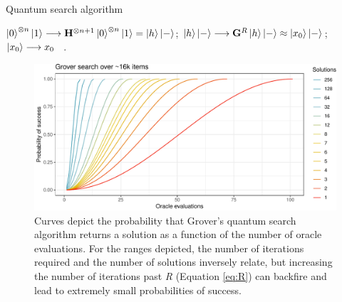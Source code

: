 \documentclass[12pt]{article} %
\DeclarePairedDelimiter{\ceil}{\lceil}{\rceil}
\begin{document}
\begin{algorithm}[t!]
	\caption{Quantum search algorithm \citep{grover1996fast}}\label{alg:grover}
	$\ket{0}^{\otimes n}\ket{1} \longrightarrow \mathbf{H}^{\otimes n+1}\ket{0}^{\otimes n}\ket{1}=\ket{h}\ket{-}$; \hspace{5em}  
	$\ket{h}\ket{-} \longrightarrow \mathbf{G}^R \ket{h}\ket{-} \approx \ket{x_0}\ket{-}$;    \hspace{3em}         
	$\ket{x_0} \longrightarrow x_0$\;
	\ .
\end{algorithm}

\begin{figure}[!t]
	\centering
	\includegraphics[width=0.9\linewidth]{groverCurves.pdf}
	\caption{Curves depict the probability that Grover's quantum search algorithm returns a solution as a function of the number of oracle evaluations. For the ranges depicted, the number of iterations required and the number of solutions inversely relate, but increasing the number of iterations past \emph{R} (Equation \ref{eq:R}) can backfire and lead to extremely small probabilities of success.  }\label{fig:grov}
\end{figure}
\end{document}
